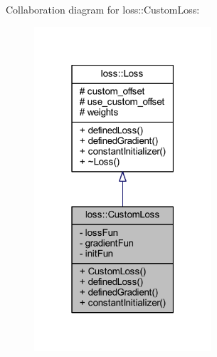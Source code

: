 Collaboration diagram for loss\+:\+:Custom\+Loss\+:
\nopagebreak
\begin{figure}[H]
\begin{center}
\leavevmode
\includegraphics[width=187pt]{classloss_1_1_custom_loss__coll__graph}
\end{center}
\end{figure}
